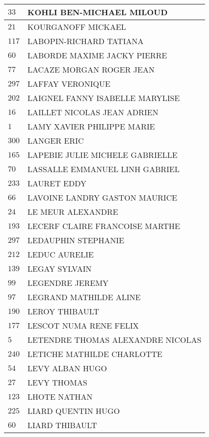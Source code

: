 \begin{xltabular}{\linewidth}{|l|X|}
    \hline
    $33$ & KOHLI BEN-MICHAEL MILOUD \\
    \hline
    $21$ & KOURGANOFF MICKAEL \\
    \hline
    $117$ & LABOPIN-RICHARD TATIANA \\
    \hline
    $60$ & LABORDE MAXIME JACKY PIERRE \\
    \hline
    $77$ & LACAZE MORGAN ROGER JEAN \\
    \hline
    $297$ & LAFFAY VERONIQUE \\
    \hline
    $202$ & LAIGNEL FANNY ISABELLE MARYLISE \\
    \hline
    $16$ & LAILLET NICOLAS JEAN ADRIEN \\
    \hline
    $1$ & LAMY XAVIER PHILIPPE MARIE \\
    \hline
    $300$ & LANGER ERIC \\
    \hline
    $165$ & LAPEBIE JULIE MICHELE GABRIELLE \\
    \hline
    $70$ & LASSALLE EMMANUEL LINH GABRIEL \\
    \hline
    $233$ & LAURET EDDY \\
    \hline
    $66$ & LAVOINE LANDRY GASTON MAURICE \\
    \hline
    $24$ & LE MEUR ALEXANDRE \\
    \hline
    $193$ & LECERF CLAIRE FRANCOISE MARTHE \\
    \hline
    $297$ & LEDAUPHIN STEPHANIE \\
    \hline
    $212$ & LEDUC AURELIE \\
    \hline
    $139$ & LEGAY SYLVAIN \\
    \hline
    $99$ & LEGENDRE JEREMY \\
    \hline
    $97$ & LEGRAND MATHILDE ALINE \\
    \hline
    $190$ & LEROY THIBAULT \\
    \hline
    $177$ & LESCOT NUMA RENE FELIX \\
    \hline
    $5$ & LETENDRE THOMAS ALEXANDRE NICOLAS \\
    \hline
    $240$ & LETICHE MATHILDE CHARLOTTE \\
    \hline
    $54$ & LEVY ALBAN HUGO \\
    \hline
    $27$ & LEVY THOMAS \\
    \hline
    $123$ & LHOTE NATHAN \\
    \hline
    $225$ & LIARD QUENTIN HUGO \\
    \hline
    $60$ & LIARD THIBAULT \\

\end{xltabular}
